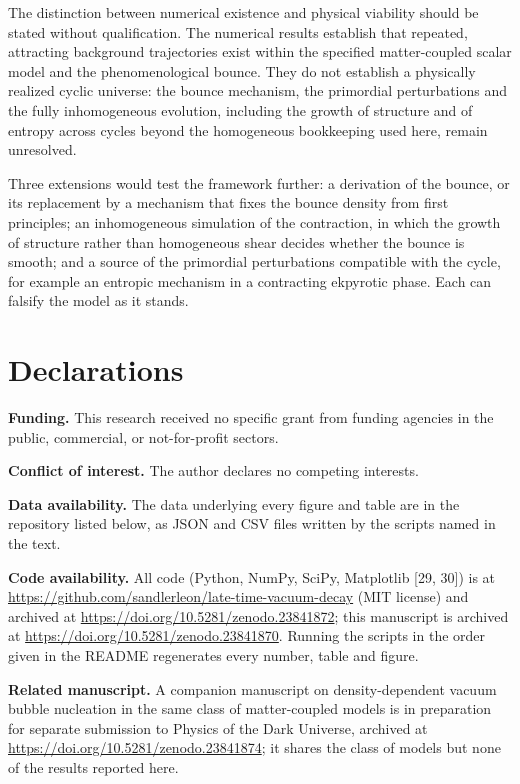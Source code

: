\documentclass[11pt,a4paper]{article}
\begin{document}
The distinction between numerical existence and physical viability should be stated without qualification. The numerical results establish that repeated, attracting background trajectories exist within the specified matter-coupled scalar model and the phenomenological bounce. They do not establish a physically realized cyclic universe: the bounce mechanism, the primordial perturbations and the fully inhomogeneous evolution, including the growth of structure and of entropy across cycles beyond the homogeneous bookkeeping used here, remain unresolved.

Three extensions would test the framework further: a derivation of the bounce, or its replacement by a mechanism that fixes the bounce density from first principles; an inhomogeneous simulation of the contraction, in which the growth of structure rather than homogeneous shear decides whether the bounce is smooth; and a source of the primordial perturbations compatible with the cycle, for example an entropic mechanism in a contracting ekpyrotic phase. Each can falsify the model as it stands.

\section*{Declarations}
\noindent\textbf{Funding.} This research received no specific grant from funding agencies in the public, commercial, or not-for-profit sectors.

\noindent\textbf{Conflict of interest.} The author declares no competing interests.

\noindent\textbf{Data availability.} The data underlying every figure and table are in the repository listed below, as JSON and CSV files written by the scripts named in the text.

\noindent\textbf{Code availability.} All code (Python, NumPy, SciPy, Matplotlib [29, 30]) is at \url{https://github.com/sandlerleon/late-time-vacuum-decay} (MIT license) and archived at \url{https://doi.org/10.5281/zenodo.23841872}; this manuscript is archived at \url{https://doi.org/10.5281/zenodo.23841870}. Running the scripts in the order given in the README regenerates every number, table and figure.

\noindent\textbf{Related manuscript.} A companion manuscript on density-dependent vacuum bubble nucleation in the same class of matter-coupled models is in preparation for separate submission to Physics of the Dark Universe, archived at \url{https://doi.org/10.5281/zenodo.23841874}; it shares the class of models but none of the results reported here.
\end{document}
